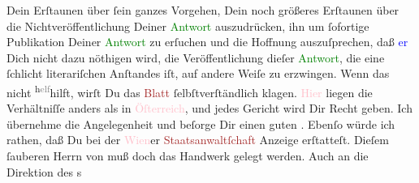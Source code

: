                Dein Erſtaunen über ſein ganzes Vorgehen, Dein noch größeres Erſtaunen über  die Nichtveröffentlichung Deiner \textcolor{green}{Antwort}{}\ledrightnote{{$\rightarrow$}\textcolor{green}{Das angebliche Telegramm Arthur Schnitzlers}} auszudrücken, ihn um ſofortige
               Publikation Deiner \textcolor{green}{Antwort}{}\ledrightnote{{$\rightarrow$}\textcolor{green}{Das angebliche Telegramm Arthur Schnitzlers}} zu
               erſuchen und die Hoffnung auszuſprechen, daß {\pb}\textcolor{blue}{er}{}\ledrightnote{{$\rightarrow$}\textcolor{blue}{Karl Strecker}} Dich nicht dazu nöthigen
               wird, die Veröffentlichung dieſer \textcolor{green}{Antwort}{}\ledrightnote{{$\rightarrow$}\textcolor{green}{Das angebliche Telegramm Arthur Schnitzlers}}, die eine ſchlicht literariſchen Anſtandes iſt, auf andere Weiſe zu
               erzwingen. Wenn das nicht \substVorne{}\textsuperscript{h\textcolor{gray}{elf}}\substDazwischen{}hilft\substHinten{}, wirſt Du das \textcolor{brown}{Blatt}{}\ledrightnote{{$\rightarrow$}\textcolor{brown}{Tägliche Rundschau}}
               ſelbſtverſtändlich klagen. \textcolor{pink}{Hier}{}\ledrightnote{{$\rightarrow$}\textcolor{pink}{Deutschland}}
               liegen die Verhältniſſe anders als in \textcolor{pink}{Öſterreich}{}\ledrightnote{\textcolor{pink}{Österreich}}, und jedes Gericht wird Dir Recht geben. Ich übernehme die
               Angelegenheit und beſorge Dir einen guten \label{K_L03205-3v}\label{K_L03205-3h}. Ebenſo würde ich rathen, daß Du bei der \textcolor{pink}{Wien}{}\ledrightnote{\textcolor{pink}{Wien}}er \textcolor{brown}{Staatsanwaltſchaft}{}\ledrightnote{\textcolor{brown}{Staatsanwaltschaft}} Anzeige erſtatteſt. Dieſem ſauberen Herrn von \label{K_L03205-4v}\label{K_L03205-4h} muß
               doch das Handwerk gelegt werden. Auch an die {\pb}Direktion des \label{K_L03205-5v}\label{K_L03205-5h}s
